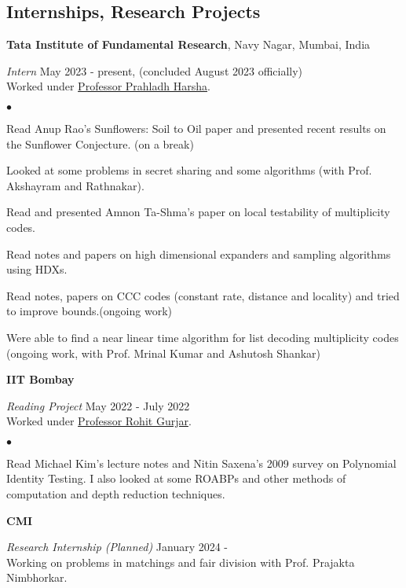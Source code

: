 \documentclass[margin,line, 10pt]{res}
\newenvironment{list2}{
  \begin{list}{$\bullet$}{%
      \setlength{\itemsep}{0in}
      \setlength{\parsep}{0in} \setlength{\parskip}{0in}
      \setlength{\topsep}{0in} \setlength{\partopsep}{0in} 
      \setlength{\leftmargin}{0.2in}}}{\end{list}}
\begin{document}
\begin{resume}
\section{\sc Internships, Research Projects}
{\bf Tata Institute of Fundamental Research}, Navy Nagar, Mumbai, India

\vspace{-.3cm}
{\em Intern} \hfill {May 2023 - present, (concluded August 2023 officially)}\\
Worked under \href{https://www.tifr.res.in/~prahladh/}{Professor Prahladh Harsha}.

\vspace*{.05in}  
\begin{list2}
\item Read Anup Rao's Sunflowers: Soil to Oil paper and presented recent results on the Sunflower Conjecture. (on a break)
\item Looked at some problems in secret sharing and some algorithms (with Prof. Akshayram and Rathnakar).
\item Read and presented Amnon Ta-Shma's paper on local testability of multiplicity codes.
\item Read notes and papers on high dimensional expanders and sampling algorithms using HDXs.
\item Read notes, papers on CCC codes (constant rate, distance and locality) and tried to improve bounds.(ongoing work)
\item Were able to find a near linear time algorithm for list decoding multiplicity codes (ongoing work, with Prof. Mrinal Kumar and Ashutosh Shankar)
\end{list2}

\eject
{\bf IIT Bombay}

\vspace{-.3cm}
{\em Reading Project} \hfill {May 2022 - July 2022}\\
Worked under \href{https://www.cse.iitb.ac.in/~rgurjar/}{Professor Rohit Gurjar}.

\vspace*{.05in}  
\begin{list2}
\item Read Michael Kim's lecture notes and Nitin Saxena's 2009 survey on Polynomial Identity Testing. I also looked at some ROABPs and other methods of computation and depth reduction techniques.
\end{list2}

{\bf CMI}

\vspace{-.3cm}
{\em Research Internship (Planned)} \hfill {January 2024 - }\\
Working on problems in matchings and fair division with Prof. Prajakta Nimbhorkar. 

\end{resume}
\end{document}
